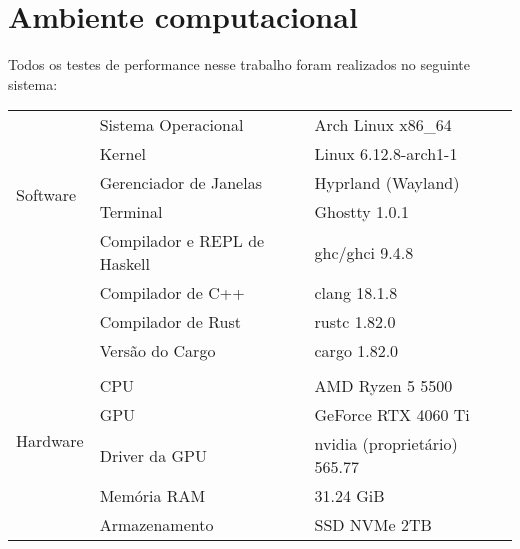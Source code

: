 \chapter{Ambiente computacional}

Todos os testes de performance nesse trabalho foram realizados no seguinte sistema:

\begin{table}[!ht]
	\centering
	\begin{tabular}{llll}
		\toprule
		\multirow{5}{3cm}{Software}
		 & Sistema Operacional          & Arch Linux x86\_64           & \\
		 & Kernel                       & Linux 6.12.8-arch1-1         & \\
		 & Gerenciador de Janelas       & Hyprland (Wayland)           & \\
		 & Terminal                     & Ghostty 1.0.1                & \\
		 & Compilador e REPL de Haskell & ghc/ghci 9.4.8               & \\
		 & Compilador de C++            & clang 18.1.8                 & \\
		 & Compilador de Rust           & rustc 1.82.0                 & \\
		 & Versão do Cargo              & cargo 1.82.0                 & \\
		 &                              &                              & \\
		\multirow{4}{3cm}{Hardware}
		 & CPU                          & AMD Ryzen 5 5500             & \\
		 & GPU                          & GeForce RTX 4060 Ti          & \\
		 & Driver da GPU                & nvidia (proprietário) 565.77 & \\
		 & Memória RAM                  & 31.24 GiB                    & \\
		 & Armazenamento                & SSD NVMe 2TB                 & \\
		\bottomrule
	\end{tabular}
\end{table}

\noindent
